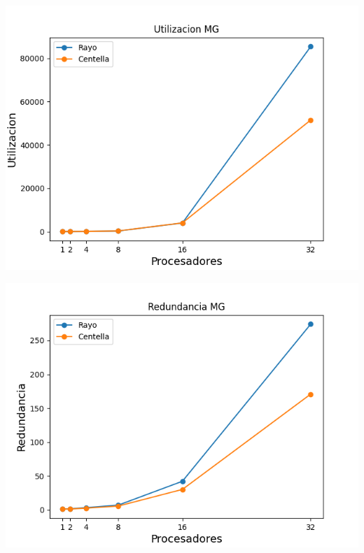 \begin{center}
 \centering
  \begin{minipage}[b]{.49\textwidth}
  \includegraphics[width=1\linewidth]{plots/utilizacion-mg.png}
 \end{minipage}
 \begin{minipage}[b]{.49\textwidth}
  \includegraphics[width=1\linewidth]{plots/redundancy-mg.png}
 \end{minipage}
\end{center}

